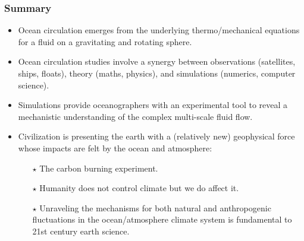 \documentclass[10pt]{beamer}
\begin{document}
\begin{frame}
  \frametitle{Summary}

\begin{exampleblock}{}

\begin{itemize}

\item Ocean circulation emerges from the underlying thermo/mechanical
  equations for a fluid on a gravitating and rotating sphere.

\item Ocean circulation studies involve a synergy between observations
  (satellites, ships, floats), theory (maths, physics), and
  simulations (numerics, computer science).

\item Simulations provide oceanographers with an experimental tool to
  reveal a mechanistic understanding of the complex multi-scale fluid
  flow.

\item Civilization is presenting the earth with a (relatively new)
  geophysical force whose impacts are felt by the ocean and
  atmosphere: 
   \begin{itemize}
   \item[$\star$]  The carbon burning experiment. 
   \item[$\star$] Humanity does not control climate but we do affect
     it.
   \item[$\star$] Unraveling the mechanisms for both natural and
     anthropogenic fluctuations in the ocean/atmosphere climate system
     is fundamental to 21st century earth science.
  \end{itemize}
 
\end{itemize}


\end{exampleblock}{}

\end{frame}
\end{document}

